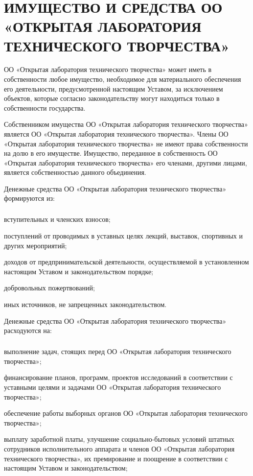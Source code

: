 \documentclass[a4paper,fontsize=14pt,titlepage]{scrartcl}
\makeatletter
\newenvironment{numberedpars}{%
  \addtocounter{secnumdepth}{1}
  \renewcommand\theparagraph{\arabic{section}.\arabic{paragraph}}
  \renewcommand\@seccntformat[1]
  {\expandafter\ifx\csname##1\endcsname\paragraph\csname 
  the##1\endcsname\else\csname the##1\endcsname\quad\fi}
  \let\old@par=\par
  \def\new@par{\let\par=\old@par\paragraph{}\let\par=\new@par}
  \let\par=\new@par
  \par
}{
  \addtocounter{secnumdepth}{-1}
}
\newenvironment{numberedsubpars}{%
  \addtocounter{secnumdepth}{1}
  \renewcommand\thesubparagraph{\arabic{section}.\arabic{paragraph}.\arabic{subparagraph}}
  \renewcommand\@seccntformat[1]
  {\expandafter\ifx\csname##1\endcsname\subparagraph\csname 
  the##1\endcsname\else\csname the##1\endcsname\quad\fi}
  \let\old@@par=\par
  \def\new@@par{\let\par=\old@par\subparagraph{}\let\par=\new@@par}
  \let\par=\new@@par
  \par
}{
  \addtocounter{secnumdepth}{-1}
  \let\par=\old@@par
}
\let\@@@section=\section
\renewcommand\section[1]{\@@@section{\MakeUppercase{#1}}}
\makeatother
\begin{document}
\section{Имущество и средства ОО «Открытая лаборатория технического творчества»}

\begin{numberedpars}
ОО «Открытая лаборатория технического творчества» может иметь в собственности любое имущество, необходимое для
материального обеспечения его деятельности, предусмотренной настоящим Уставом, за исключением объектов, которые согласно
законодательству могут находиться только в собственности государства.

Собственником имущества ОО «Открытая лаборатория технического творчества» является ОО «Открытая лаборатория технического
творчества». Члены ОО «Открытая лаборатория технического творчества» не имеют права собственности на долю в его
имуществе. Имущество, переданное в собственность ОО «Открытая лаборатория технического творчества» его членами, другими
лицами, является собственностью данного объединения.

Денежные средства ОО «Открытая лаборатория технического творчества» формируются из:
\begin{numberedsubpars}
вступительных и членских взносов;

поступлений от проводимых в уставных целях лекций, выставок, спортивных и других мероприятий;

доходов от предпринимательской деятельности, осуществляемой в установленном настоящим Уставом и законодательством
порядке;

добровольных пожертвований;

иных источников, не запрещенных законодательством.
\end{numberedsubpars}

Денежные средства ОО «Открытая лаборатория технического творчества» расходуются на:
\begin{numberedsubpars}
выполнение задач, стоящих перед ОО «Открытая лаборатория технического творчества»;

финансирование планов, программ, проектов исследований в соответствии с уставными целями и задачами ОО «Открытая
лаборатория технического творчества»;

обеспечение работы выборных органов ОО «Открытая лаборатория технического творчества»;

выплату заработной платы, улучшение социально-бытовых условий штатных сотрудников исполнительного аппарата и членов ОО
«Открытая лаборатория технического творчества», их премирование и поощрение в соответствии с настоящим Уставом и
законодательством;


\end{numberedsubpars}
\end{numberedpars}
\end{document}
